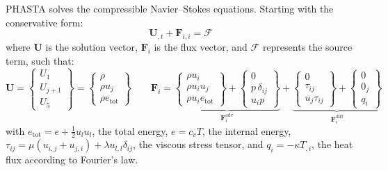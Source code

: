 \documentclass{ucb}
\begin{document}
PHASTA solves the compressible Navier--Stokes equations. Starting with the conservative form:
\begin{equation}
    \bm{U}_{,t} + \bm{F}_{i,i} = \bm{\mathcal{F}}
    \label{eq:ns}
\end{equation}
where $\bm{U}$ is the solution vector, $\bm{F}_i$ is the flux vector, and $\bm{\mathcal{F}}$ represents the source term, such that:
\begin{equation}
    \bm{U} =
     \begin{Bmatrix}
        U_1 \\
        U_{j+1} \\
        U_5
    \end{Bmatrix}
    =
    \begin{Bmatrix}
        \rho \\
        \rho u_j \\
        \rho e_\mathrm{tot}
    \end{Bmatrix}
    \qquad
    \bm{F}_i =
    \underbrace{
        \begin{Bmatrix}
            \rho u_i \\
            \rho u_i u_j \\
            \rho u_i e_\mathrm{tot}
        \end{Bmatrix}
        +
        \begin{Bmatrix}
            0 \\
            p\,\delta_{ij} \\
            u_i p
        \end{Bmatrix}
    }_{\bm{F}_i^\mathrm{adv}}
    +
    \underbrace{
        \begin{Bmatrix}
            0 \\
            \tau_{ij} \\
            u_j\tau_{ij}
        \end{Bmatrix}
        +
        \begin{Bmatrix}
            0 \\
            0_j \\
            q_i
        \end{Bmatrix}
    }_{\bm{F}_i^\mathrm{diff}}
\end{equation}
with $e_\mathrm{tot} = e + \frac{1}{2}u_lu_l$, the total energy, $e = c_vT$, the internal energy, $\tau_{ij} = \mu\left(u_{i,j} + u_{j,i}\right) + \lambda u_{l,l}\delta_{ij}$, the viscous stress tensor, and $q_i = -\kappa T_{,i}$, the heat flux according to Fourier's law.
\end{document}
